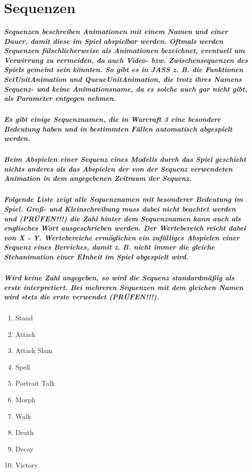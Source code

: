 \chapter { Sequenzen }
\paragraph { Sequenzen beschreiben Animationen mit einem Namen und einer Dauer, damit diese im Spiel abspielbar werden. Oftmals werden Sequenzen fälschlicherweise als Animationen bezeichnet, eventuell um Verwirrung zu vermeiden, da auch Video- bzw. Zwischensequenzen des Spiels gemeint sein könnten. So gibt es in JASS z. B. die Funktionen SetUnitAnimation und QueueUnitAnimation, die trotz ihres Namens Sequenz- und keine Animationsname, da es solche auch gar nicht gibt, als Parameter entgegen nehmen. }
\paragraph { Es gibt einige Sequenznamen, die in Warcraft 3 eine besondere Bedeutung haben und in bestimmten Fällen automatisch abgespielt werden. }
\paragraph { Beim Abspielen einer Sequenz eines Modells durch das Spiel geschieht nichts anderes als das Abspielen der von der Sequenz verwendeten Animation in dem angegebenen Zeitraum der Sequenz. }
\paragraph { Folgende Liste zeigt alle Sequenznamen mit besonderer Bedeutung im Spiel. Groß- und Kleinschreibung muss dabei nicht beachtet werden und (PRÜFEN!!!) die Zahl hinter dem Sequenznamen kann auch als englisches Wort ausgeschrieben werden. Der Wertebereich reicht dabei von X - Y. Wertebereiche ermöglichen ein zufälliges Abspielen einer Sequenz eines Bereiches, damit z. B. nicht immer die gleiche Stehanimation einer EInheit im Spiel abgespielt wird. }
\paragraph { Wird keine Zahl angegeben, so wird die Sequenz standardmäßig als erste interpretiert. Bei mehreren Sequenzen mit dem gleichen Namen wird stets die erste verwendet (PRÜFEN!!!). }
\begin{enumerate}
	\item Stand
	\item Attack
	\item Attack Slam
	\item Spell
	\item Portrait Talk
	\item Morph
	\item Walk
	\item Death
	\item Decay
	\item Victory
\end{enumerate}


